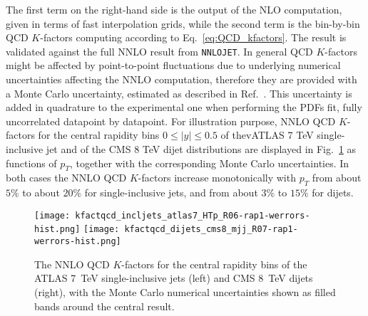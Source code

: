 The first term on the right-hand side is the output of the NLO computation, given in terms of fast interpolation grids,
while the second term is the bin-by-bin QCD $K$-factors computing according to Eq.~\ref{eq:QCD_kfactors}. 
The result is validated against the full NNLO result from {\tt NNLOJET}. In general QCD $K$-factors might be affected by 
point-to-point fluctuations due to underlying numerical uncertainties affecting the NNLO computation,
therefore they are provided with a Monte Carlo uncertainty, estimated as described in Ref.~\cite{Ridder:2016rzm}.
This uncertainty is added in quadrature to the experimental one when performing the PDFs fit, fully uncorrelated datapoint 
by datapoint.
For illustration purpose, NNLO QCD $K$-factors for the central rapidity bins $0\leq |y| \leq 0.5$
of thevATLAS 7 TeV single-inclusive jet and of the CMS 8 TeV dijet distributions are displayed 
in Fig.~\ref{fig:kfactqcd_werrors} as functions of $p_T$, together with the corresponding Monte Carlo uncertainties.
In both cases the NNLO QCD $K$-factors increase monotonically with $p_T$ from about $5\%$ to about $20\%$ for single-inclusive
jets, and from about $3\%$ to $15\%$ for dijets. 
\begin{figure}[!t]
    \centering
    \texttt{[image: kfactqcd\_incljets\_atlas7\_HTp\_R06-rap1-werrors-hist.png]}
    \texttt{[image: kfactqcd\_dijets\_cms8\_mjj\_R07-rap1-werrors-hist.png]}
    \caption{The NNLO QCD $K$-factors for the central rapidity bins of the ATLAS 
       7~TeV single-inclusive jets (left) and CMS 8~TeV dijets (right), with
       the Monte Carlo numerical uncertainties shown as filled bands around the 
       central result.}
\label{fig:kfactqcd_werrors} 
\end{figure}

